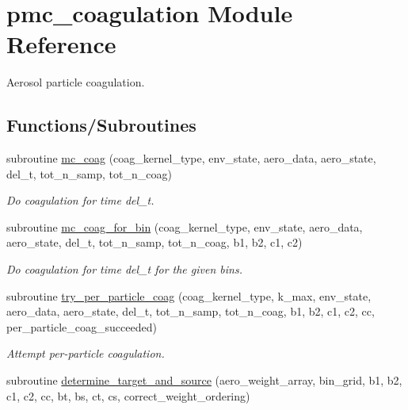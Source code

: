 \hypertarget{namespacepmc__coagulation}{}\section{pmc\+\_\+coagulation Module Reference}
\label{namespacepmc__coagulation}


Aerosol particle coagulation.  


\subsection*{Functions/\+Subroutines}
\begin{DoxyCompactItemize}
\item 
subroutine \mbox{\hyperlink{namespacepmc__coagulation_ac4aa547a592f79bcd9beed2ed8af6a66}{mc\+\_\+coag}} (coag\+\_\+kernel\+\_\+type, env\+\_\+state, aero\+\_\+data, aero\+\_\+state, del\+\_\+t, tot\+\_\+n\+\_\+samp, tot\+\_\+n\+\_\+coag)
\begin{DoxyCompactList}\small\item\em Do coagulation for time del\+\_\+t. \end{DoxyCompactList}\item 
subroutine \mbox{\hyperlink{namespacepmc__coagulation_a89d4e9f643d866b066134cfea4b68e0f}{mc\+\_\+coag\+\_\+for\+\_\+bin}} (coag\+\_\+kernel\+\_\+type, env\+\_\+state, aero\+\_\+data, aero\+\_\+state, del\+\_\+t, tot\+\_\+n\+\_\+samp, tot\+\_\+n\+\_\+coag, b1, b2, c1, c2)
\begin{DoxyCompactList}\small\item\em Do coagulation for time del\+\_\+t for the given bins. \end{DoxyCompactList}\item 
subroutine \mbox{\hyperlink{namespacepmc__coagulation_a8257679dccc3b287cf254bdd9c810aae}{try\+\_\+per\+\_\+particle\+\_\+coag}} (coag\+\_\+kernel\+\_\+type, k\+\_\+max, env\+\_\+state, aero\+\_\+data, aero\+\_\+state, del\+\_\+t, tot\+\_\+n\+\_\+samp, tot\+\_\+n\+\_\+coag, b1, b2, c1, c2, cc, per\+\_\+particle\+\_\+coag\+\_\+succeeded)
\begin{DoxyCompactList}\small\item\em Attempt per-\/particle coagulation. \end{DoxyCompactList}\item 
subroutine \mbox{\hyperlink{namespacepmc__coagulation_a475dbce9c2097d091a45066282188b3c}{determine\+\_\+target\+\_\+and\+\_\+source}} (aero\+\_\+weight\+\_\+array, bin\+\_\+grid, b1, b2, c1, c2, cc, bt, bs, ct, cs, correct\+\_\+weight\+\_\+ordering)

\end{DoxyCompactItemize}
